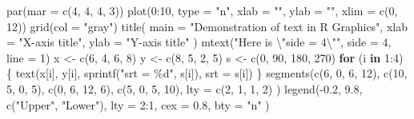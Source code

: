 \documentclass[
  b5paper,
  UTF8,twoside]{book}
\newenvironment{Shaded}{\begin{snugshade}}{\end{snugshade}}
\newcommand{\AttributeTok}[1]{\textcolor[rgb]{0.77,0.63,0.00}{#1}}
\newcommand{\ControlFlowTok}[1]{\textcolor[rgb]{0.13,0.29,0.53}{\textbf{#1}}}
\newcommand{\DecValTok}[1]{\textcolor[rgb]{0.00,0.00,0.81}{#1}}
\newcommand{\FloatTok}[1]{\textcolor[rgb]{0.00,0.00,0.81}{#1}}
\newcommand{\FunctionTok}[1]{\textcolor[rgb]{0.00,0.00,0.00}{#1}}
\newcommand{\NormalTok}[1]{#1}
\newcommand{\OtherTok}[1]{\textcolor[rgb]{0.56,0.35,0.01}{#1}}
\newcommand{\SpecialCharTok}[1]{\textcolor[rgb]{0.00,0.00,0.00}{#1}}
\newcommand{\StringTok}[1]{\textcolor[rgb]{0.31,0.60,0.02}{#1}}
\begin{document}
\begin{Shaded}
\begin{Highlighting}[]
\FunctionTok{par}\NormalTok{(}\AttributeTok{mar =} \FunctionTok{c}\NormalTok{(}\DecValTok{4}\NormalTok{, }\DecValTok{4}\NormalTok{, }\DecValTok{4}\NormalTok{, }\DecValTok{3}\NormalTok{))}
\FunctionTok{plot}\NormalTok{(}\DecValTok{0}\SpecialCharTok{:}\DecValTok{10}\NormalTok{, }\AttributeTok{type =} \StringTok{"n"}\NormalTok{, }\AttributeTok{xlab =} \StringTok{""}\NormalTok{, }\AttributeTok{ylab =} \StringTok{""}\NormalTok{, }\AttributeTok{xlim =} \FunctionTok{c}\NormalTok{(}\DecValTok{0}\NormalTok{, }\DecValTok{12}\NormalTok{))}
\FunctionTok{grid}\NormalTok{(}\AttributeTok{col =} \StringTok{"gray"}\NormalTok{)}
\FunctionTok{title}\NormalTok{(}
  \AttributeTok{main =} \StringTok{"Demonstration of text in R Graphics"}\NormalTok{,}
  \AttributeTok{xlab =} \StringTok{"X{-}axis title"}\NormalTok{, }\AttributeTok{ylab =} \StringTok{"Y{-}axis title"}
\NormalTok{)}
\FunctionTok{mtext}\NormalTok{(}\StringTok{"Here is }\SpecialCharTok{\textbackslash{}"}\StringTok{side = 4}\SpecialCharTok{\textbackslash{}"}\StringTok{"}\NormalTok{, }\AttributeTok{side =} \DecValTok{4}\NormalTok{, }\AttributeTok{line =} \DecValTok{1}\NormalTok{)}
\NormalTok{x }\OtherTok{\textless{}{-}} \FunctionTok{c}\NormalTok{(}\DecValTok{6}\NormalTok{, }\DecValTok{4}\NormalTok{, }\DecValTok{6}\NormalTok{, }\DecValTok{8}\NormalTok{)}
\NormalTok{y }\OtherTok{\textless{}{-}} \FunctionTok{c}\NormalTok{(}\DecValTok{8}\NormalTok{, }\DecValTok{5}\NormalTok{, }\DecValTok{2}\NormalTok{, }\DecValTok{5}\NormalTok{)}
\NormalTok{s }\OtherTok{\textless{}{-}} \FunctionTok{c}\NormalTok{(}\DecValTok{0}\NormalTok{, }\DecValTok{90}\NormalTok{, }\DecValTok{180}\NormalTok{, }\DecValTok{270}\NormalTok{)}
\ControlFlowTok{for}\NormalTok{ (i }\ControlFlowTok{in} \DecValTok{1}\SpecialCharTok{:}\DecValTok{4}\NormalTok{) \{}
  \FunctionTok{text}\NormalTok{(x[i], y[i], }\FunctionTok{sprintf}\NormalTok{(}\StringTok{"srt = \%d"}\NormalTok{, s[i]), }\AttributeTok{srt =}\NormalTok{ s[i])}
\NormalTok{\}}
\FunctionTok{segments}\NormalTok{(}\FunctionTok{c}\NormalTok{(}\DecValTok{6}\NormalTok{, }\DecValTok{0}\NormalTok{, }\DecValTok{6}\NormalTok{, }\DecValTok{12}\NormalTok{), }\FunctionTok{c}\NormalTok{(}\DecValTok{10}\NormalTok{, }\DecValTok{5}\NormalTok{, }\DecValTok{0}\NormalTok{, }\DecValTok{5}\NormalTok{), }\FunctionTok{c}\NormalTok{(}\DecValTok{0}\NormalTok{, }\DecValTok{6}\NormalTok{, }\DecValTok{12}\NormalTok{, }\DecValTok{6}\NormalTok{),}
  \FunctionTok{c}\NormalTok{(}\DecValTok{5}\NormalTok{, }\DecValTok{0}\NormalTok{, }\DecValTok{5}\NormalTok{, }\DecValTok{10}\NormalTok{),}
  \AttributeTok{lty =} \FunctionTok{c}\NormalTok{(}\DecValTok{2}\NormalTok{, }\DecValTok{1}\NormalTok{, }\DecValTok{1}\NormalTok{, }\DecValTok{2}\NormalTok{)}
\NormalTok{)}
\FunctionTok{legend}\NormalTok{(}\SpecialCharTok{{-}}\FloatTok{0.2}\NormalTok{, }\FloatTok{9.8}\NormalTok{, }\FunctionTok{c}\NormalTok{(}\StringTok{"Upper"}\NormalTok{, }\StringTok{"Lower"}\NormalTok{),}
  \AttributeTok{lty =} \DecValTok{2}\SpecialCharTok{:}\DecValTok{1}\NormalTok{, }\AttributeTok{cex =} \FloatTok{0.8}\NormalTok{,}
  \AttributeTok{bty =} \StringTok{"n"}
\NormalTok{)}
\end{Highlighting}
\end{Shaded}
\end{document}
